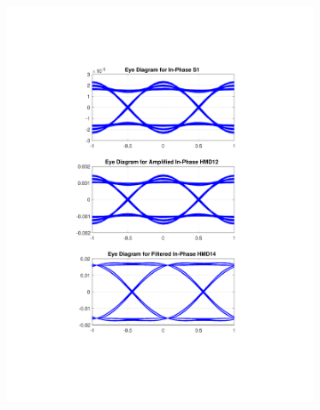 \begin{figure}[H]
	\centering
	\begin{subfigure}{.45\textwidth}
		\centering
		\includegraphics[clip, trim=5cm 4cm 5cm 4cm,
			width=\textwidth]{./sdf/m_qam_system/figures/eyes/if_nn_p_60_09.pdf}
	\end{subfigure}
	\begin{subfigure}{.45\textwidth}
		\centering

\end{subfigure}
\end{figure}
